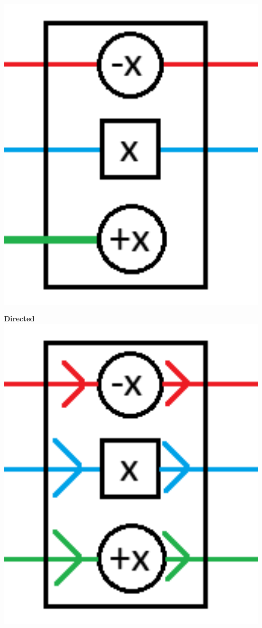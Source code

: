 \documentclass{beamer}
\begin{document}
\begin{frame}
\begin{minipage}[b]{0.32\textwidth}
    \includegraphics[width=1\textwidth]{res/doors/DoorOpenOptional.png}
  \end{minipage}
  \begin{minipage}[b]{0.32\textwidth}
    \textbf{Directed}
    \includegraphics[width=1\textwidth]{res/doors/DoorDirected.png}
  \end{minipage}

\end{frame}
\end{document}
